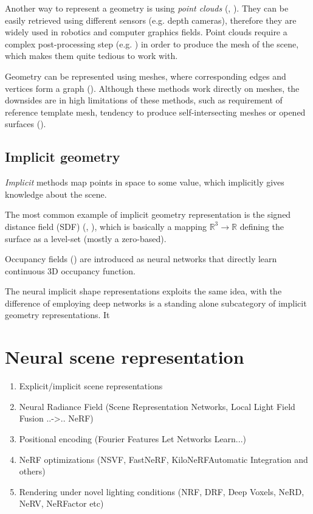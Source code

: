 Another way to represent a geometry is using \textit{point clouds} (\cite{qi2017pointnet}, \cite{fan2016point}).
They can be easily retrieved using different sensors (e.g. depth cameras),
therefore they are widely used in robotics and computer graphics fields.
Point clouds require a complex post-processing step
(e.g. \cite{ballpivoting1999bernardini}) in order to produce the mesh of the scene,
which makes them quite tedious to work with.

Geometry can be represented using meshes,
where corresponding edges and vertices form a graph (\cite{wang20183d}).
Although these methods work directly on meshes,
the downsides are in high limitations of these methods,
such as requirement of reference template mesh,
tendency to produce self-intersecting meshes or opened surfaces (\cite{groueix2018atlasnet}).

\subsection{Implicit geometry}

\textit{Implicit} methods map points in space to some value,
which implicitly gives knowledge about the scene.

The most common example of implicit geometry representation is the signed distance field (SDF) (\cite{truncdistfield1996curless}, \cite{Lombardi_2019}),
which is basically a mapping $\mathbb{R}^3 \xrightarrow{} \mathbb{R}$ defining the surface as a level-set (mostly a zero-based).

Occupancy fields (\cite{occupancy2019mescheder}) are introduced as neural networks that directly learn continuous 3D occupancy function.

The neural implicit shape representations exploits the same idea,
with the difference of employing deep networks
is a standing alone subcategory of implicit geometry representations.
It 




\section{Neural scene representation}

{\color{teal}
\begin{enumerate}
    \item Explicit/implicit scene representations
    \item Neural Radiance Field (Scene Representation Networks, Local Light Field Fusion ..->.. NeRF)
    \item Positional encoding (Fourier Features Let Networks Learn...) %
    \item NeRF optimizations (NSVF, FastNeRF, KiloNeRFAutomatic Integration and others)
    \item Rendering under novel lighting conditions (NRF, DRF, Deep Voxels, NeRD, NeRV, NeRFactor etc)
\end{enumerate}
}



